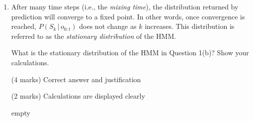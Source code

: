 \documentclass[12pt]{article}
\begin{document}
\begin{enumerate}[font=\Large,label=(\alph*)]
\begin{markscheme}

(6 marks) Correct derivation

(2 marks) Correct rules/assumptions cited

\end{markscheme}

\begin{sol}
    {\color{blue} 

        empty

    }   
    \end{sol}

\item
After many time steps (i.e., the \textit{mixing time}), the distribution returned by prediction will converge to a fixed point. In other words, once convergence is reached, $P(S_{k}\,|\,o_{0:t})$ does not change as $k$ increases. This distribution is referred to as the \textit{stationary distribution} of the HMM.

What is the stationary distribution of the HMM in Question 1(b)? Show your calculations.

\begin{markscheme}

(4 marks) Correct answer and justification

(2 marks) Calculations are displayed clearly

\end{markscheme}

\begin{sol}
    {\color{blue} 

        empty

    }   
    \end{sol}
    
\end{enumerate}
\end{document}
